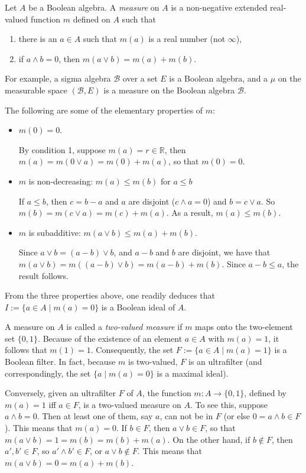 \documentclass[12pt]{article}
\begin{document}
Let $A$ be a Boolean algebra.  A \emph{measure} on $A$ is a non-negative extended real-valued function $m$ defined on $A$ such that
\begin{enumerate}
\item there is an $a\in A$ such that $m(a)$ is a real number (not $\infty$),
\item if $a\wedge  b=0$, then $m(a\vee b)=m(a)+m(b)$.
\end{enumerate}

For example, a sigma algebra $\mathcal{B}$ over a set $E$ is a Boolean algebra, and a  $\mu$ on the measurable space $(\mathcal{B},E)$ is a measure on the Boolean algebra $\mathcal{B}$.

The following are some of the elementary properties of $m$:
\begin{itemize}
\item $m(0)=0$.

By condition 1, suppose $m(a)=r\in \mathbb{R}$, then $m(a)=m(0\vee a)=m(0)+m(a)$, so that $m(0)=0$.  
\item $m$ is non-decreasing: $m(a)\le m(b)$ for $a\le b$

If $a\le b$, then $c=b-a$ and $a$ are disjoint ($c\wedge a=0$) and $b=c\vee a$.  So $m(b)=m(c\vee a)=m(c)+m(a)$.  As a result, $m(a)\le m(b)$.
\item $m$ is subadditive: $m(a\vee b)\le m(a)+m(b)$.

Since $a\vee b=(a-b)\vee b$, and $a-b$ and $b$ are disjoint, we have that $m(a\vee b)=m((a-b)\vee b)=m(a-b)+m(b)$.  Since $a-b\le a$, the result follows.
\end{itemize}

From the three properties above, one readily deduces that $I:=\lbrace a\in A\mid m(a)=0\rbrace$ is a Boolean ideal of $A$.

A measure on $A$ is called a \emph{two-valued measure} if $m$ maps onto the two-element set $\lbrace 0,1\rbrace$.  Because of the existence of an element $a\in A$ with $m(a)=1$, it follows that $m(1)=1$.  Consequently, the set $F:=\lbrace a\in A \mid m(a)=1\rbrace$ is a Boolean filter.  In fact, because $m$ is two-valued, $F$ is an ultrafilter (and correspondingly, the set $\lbrace a\mid m(a)=0\rbrace$ is a maximal ideal).  

Conversely, given an ultrafilter $F$ of $A$, the function $m:A\to \lbrace 0,1\rbrace$, defined by $m(a)=1$ iff $a\in F$, is a two-valued measure on $A$.  To see this, suppose $a\wedge b=0$.  Then at least one of them, say $a$, can not be in $F$ (or else $0=a\wedge b\in F$).  This means that $m(a)=0$.  If $b\in F$, then $a\vee b\in F$, so that $m(a\vee b)=1=m(b)=m(b)+m(a)$.  On the other hand, if $b\notin F$, then $a',b'\in F$, so $a'\wedge b'\in F$, or $a\vee b\notin F$.  This means that $m(a\vee b)=0=m(a)+m(b)$.
\end{document}
